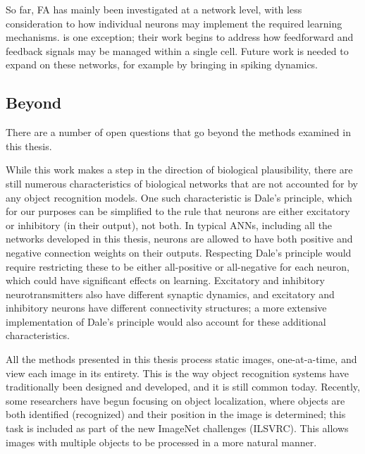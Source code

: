 So far, FA has mainly been investigated at a network level,
with less consideration to how individual neurons may implement
the required learning mechanisms.
\textcite{Guergiuev2017} is one exception;
their work begins to address how feedforward and feedback signals
may be managed within a single cell.
Future work is needed to expand on these networks,
for example by bringing in spiking dynamics.



\subsection{Beyond}

There are a number of open questions that go beyond the methods examined in this thesis.

While this work makes a step in the direction of biological plausibility,
there are still numerous characteristics of biological networks
that are not accounted for by any object recognition models.
One such characteristic is Dale's principle,
which for our purposes can be simplified to the rule
that neurons are either excitatory or inhibitory (in their output),
not both.
In typical ANNs, including all the networks developed in this thesis,
neurons are allowed to have both positive and negative connection weights
on their outputs.
Respecting Dale's principle would require restricting these to be
either all-positive or all-negative for each neuron,
which could have significant effects on learning.
Excitatory and inhibitory neurotransmitters also have different synaptic dynamics,
and excitatory and inhibitory neurons have different connectivity structures;
a more extensive implementation of Dale's principle
would also account for these additional characteristics.

All the methods presented in this thesis process static images,
one-at-a-time, and view each image in its entirety.
This is the way object recognition systems
have traditionally been designed and developed,
and it is still common today.
Recently, some researchers have begun focusing on object localization,
where objects are both identified (recognized)
and their position in the image is determined;
this task is included as part of the new ImageNet challenges (ILSVRC).
This allows images with multiple objects
to be processed in a more natural manner.

